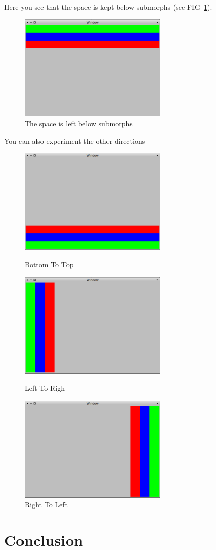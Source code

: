 \documentclass[a4paper,10pt,twoside]{book}
\begin{document}
Here you see that the space is kept below submorphs (see FIG~\ref{fig:tableLayout2}).

\begin{figure}[ht]\centering
	\includegraphics[width=7cm]{TableLayout2}
	\caption{The space is left below submorphs}
	\label{fig:tableLayout2}
\end{figure}

You can also experiment the other directions

\begin{figure}[ht]\centering
	\includegraphics[width=7cm]{TableLayout3}
	\caption{Bottom To Top}
	\label{fig:tableLayout3}
	\includegraphics[width=7cm]{TableLayout4}
	\caption{Left To Righ}
	\label{fig:tableLayout4}
	\includegraphics[width=7cm]{TableLayout5}
	\caption{Right To Left}
	\label{fig:tableLayout5}
\end{figure}


\section{Conclusion}

\ifx\wholebook\relax\else
   
   
\end{document}
